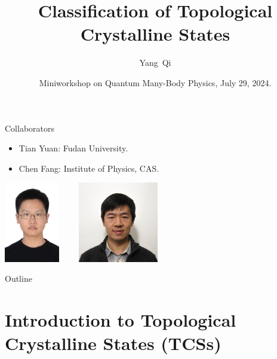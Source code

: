 \documentclass[xcolor=table, 11pt, aspectratio=169]{beamer}
\title[Space-group SPTs] %
{Classification of Topological Crystalline States}
\author[Y Qi] %
{Yang~Qi}
\institute[Fudan] %
{Department of Physics, Fudan University}
\date{Miniworkshop on Quantum Many-Body Physics, July 29, 2024.}
\begin{document}
\begin{frame}
  \titlepage
\end{frame}

\begin{frame}{Collaborators}
  \begin{itemize}
  \item Tian Yuan: Fudan University.
  \item Chen Fang: Institute of Physics, CAS.
\end{itemize}
\vspace{4em}
\begin{center}
        \includegraphics[height=3.5cm]{../people/tianyuan}~~~~
      \includegraphics[height=3.5cm]{../people/chenfang}
    \end{center}
\end{frame}

\begin{frame}{Outline}
      \tableofcontents
\end{frame}


\section{Introduction to Topological Crystalline States (TCSs)}
\end{document}
